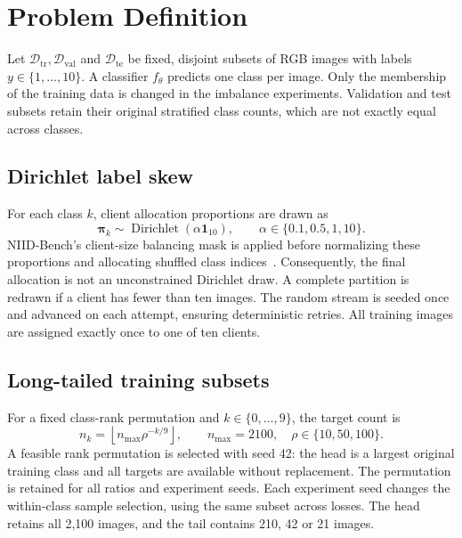 \section{Problem Definition}
Let $\mathcal{D}_{\mathrm{tr}},\mathcal{D}_{\mathrm{val}}$ and $\mathcal{D}_{\mathrm{te}}$ be fixed, disjoint subsets of RGB images with labels $y\in\{1,\ldots,10\}$. A classifier $f_\theta$ predicts one class per image. Only the membership of the training data is changed in the imbalance experiments. Validation and test subsets retain their original stratified class counts, which are not exactly equal across classes.

\subsection{Dirichlet label skew}
For each class $k$, client allocation proportions are drawn as
\begin{equation}
\boldsymbol{\pi}_k\sim\operatorname{Dirichlet}(\alpha\mathbf{1}_{10}),\qquad
\alpha\in\{0.1,0.5,1,10\}.
\end{equation}
NIID-Bench's client-size balancing mask is applied before normalizing these proportions and allocating shuffled class indices~\cite{li2022}. Consequently, the final allocation is not an unconstrained Dirichlet draw. A complete partition is redrawn if a client has fewer than ten images. The random stream is seeded once and advanced on each attempt, ensuring deterministic retries. All training images are assigned exactly once to one of ten clients.

\subsection{Long-tailed training subsets}
For a fixed class-rank permutation and $k\in\{0,\ldots,9\}$, the target count is
\begin{equation}
 n_k=\left\lfloor n_{\max}\rho^{-k/9}\right\rfloor,\qquad
 n_{\max}=2100,\quad\rho\in\{10,50,100\}.
\end{equation}
A feasible rank permutation is selected with seed 42: the head is a largest original training class and all targets are available without replacement. The permutation is retained for all ratios and experiment seeds. Each experiment seed changes the within-class sample selection, using the same subset across losses. The head retains all 2,100 images, and the tail contains 210, 42 or 21 images.

